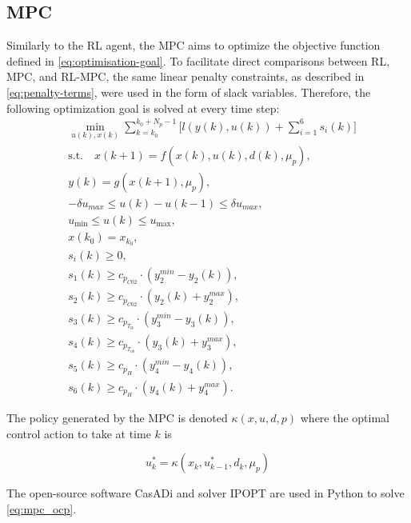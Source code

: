 \subsection{MPC}
Similarly to the RL agent, the MPC aims to optimize the objective function defined in \autoref{eq:optimisation-goal}. To facilitate direct comparisons between RL, MPC, and RL-MPC, the same linear penalty constraints, as described in \autoref{eq:penalty-terms}, were used in the form of slack variables. Therefore, the following optimization goal is solved at every time step:
\begin{equation} \label{eq:mpc_ocp}
	\begin{aligned}
		&\min_{u(k),x(k)}  \sum_{k = k_0}^{k_0 + N_p-1} \Bigg[ l(y(k),u(k)) + \sum_{i = 1}^6 s_i(k) \Bigg]  \\
		&\text{s.t.} \quad x(k+1) = f(x(k), u(k), d(k), \mu_p), \\
		 &y(k) = g(x(k+1), \mu_p), \\
		 &-\delta u_{max} \leq u(k) - u(k-1) \leq \delta u_{max}, \\
		 &u_{\min} \leq u(k) \leq u_{\max}, \\
		 &x(k_0) = x_{k_0}, \\
		 &s_i(k) \geq 0, \\
		 &s_1(k) \geq c_{p_{C02}} \cdot (y_2^{min} - y_2(k)), \\& s_2(k) \geq c_{p_{C02}} \cdot (y_2(k) + y_2^{max}), \\ 
		 &s_3(k) \geq c_{p_{T_{lb}}} \cdot (y_3^{min} - y_3(k)),\\& s_4(k) \geq c_{p_{T_{ub}}} \cdot (y_3(k) + y_3^{max}), \\ 
		 &s_5(k) \geq c_{p_{H}} \cdot (y_4^{min} - y_4(k)),\\& s_6(k) \geq c_{p_{H}} \cdot (y_4(k) + y_4^{max}).
	\end{aligned}
\end{equation}

The policy generated by the MPC is denoted $\kappa(x,u,d,p)$ where the optimal control action to take at time $k$ is

\begin{equation}\label{eq:mpc_policy_notation}
	u_k^* = \kappa(x_k,u_{k-1}^*, d_k, \mu_p)
\end{equation}

The open-source software CasADi  \cite{anderssonCasADiSoftwareFramework2019} and solver IPOPT \cite{wachterImplementationInteriorpointFilter2006} are used in Python to solve \autoref{eq:mpc_ocp}.


